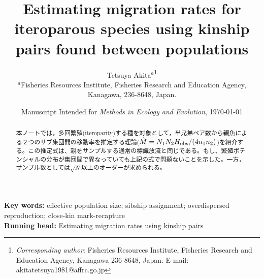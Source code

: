 \documentclass[12pt, English]{article}
\begin{document}
\title{Estimating migration rates for iteroparous species using kinship pairs found between populations}
\author{
Tetsuya Akita$^{a}$\thanks{
\emph{Corresponding author}:
    Fisheries Resources Institute, Fisheries Research and Education Agency, Kanagawa 236-8648, Japan.
    E-mail: akitatetsuya1981@affrc.go.jp} \\ 
   \small $^{a}$Fisheries Resources Institute, Fisheries Research and Education Agency, \\
   \small Kanagawa, 236-8648, Japan.
   }
\date{Manuscript Intended for \emph{Methods in Ecology and Evolution}, \today}
\maketitle

\begin{abstract}
本ノートでは，多回繁殖(iteroparity)する種を対象として，半兄弟ペア数から親魚による２つのサブ集団間の移動率を推定する理論($\hat{M}=N_1N_2H_{\rm obs}/(4n_1n_2)$)を紹介する。この推定式は、親をサンプルする通常の標識放流と同じである。もし、繁殖ポテンシャルの分布が集団間で異なっていても上記の式で問題ないことを示した。一方，サンプル数としては$\sqrt {N}$以上のオーダーが求められる。
\\
\end{abstract}
\textbf{Key words:} effective population size; sibship assignment; overdispersed reproduction; close-kin mark-recapture\\
\textbf{Running head:} Estimating migration rates using kinship pairs\\
\end{document}
